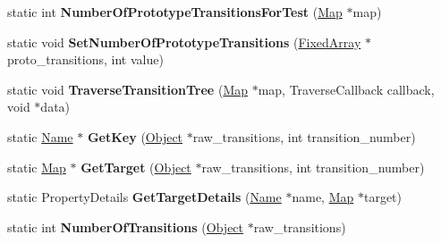 \begin{DoxyCompactItemize}
\item 
static int {\bfseries Number\+Of\+Prototype\+Transitions\+For\+Test} (\hyperlink{classv8_1_1internal_1_1_map}{Map} $\ast$map)\hypertarget{classv8_1_1internal_1_1_transition_array_a381a053abda5f8f7c09275e63b7a2a9a}{}\label{classv8_1_1internal_1_1_transition_array_a381a053abda5f8f7c09275e63b7a2a9a}

\item 
static void {\bfseries Set\+Number\+Of\+Prototype\+Transitions} (\hyperlink{classv8_1_1internal_1_1_fixed_array}{Fixed\+Array} $\ast$proto\+\_\+transitions, int value)\hypertarget{classv8_1_1internal_1_1_transition_array_a8c2e74b7b2bc1facb107706210914654}{}\label{classv8_1_1internal_1_1_transition_array_a8c2e74b7b2bc1facb107706210914654}

\item 
static void {\bfseries Traverse\+Transition\+Tree} (\hyperlink{classv8_1_1internal_1_1_map}{Map} $\ast$map, Traverse\+Callback callback, void $\ast$data)\hypertarget{classv8_1_1internal_1_1_transition_array_ab81a2e91619e1fa8ad0abba70a25fcfa}{}\label{classv8_1_1internal_1_1_transition_array_ab81a2e91619e1fa8ad0abba70a25fcfa}

\item 
static \hyperlink{classv8_1_1internal_1_1_name}{Name} $\ast$ {\bfseries Get\+Key} (\hyperlink{classv8_1_1internal_1_1_object}{Object} $\ast$raw\+\_\+transitions, int transition\+\_\+number)\hypertarget{classv8_1_1internal_1_1_transition_array_a78bcd0af8ebe9902a2a54a32578e5ba6}{}\label{classv8_1_1internal_1_1_transition_array_a78bcd0af8ebe9902a2a54a32578e5ba6}

\item 
static \hyperlink{classv8_1_1internal_1_1_map}{Map} $\ast$ {\bfseries Get\+Target} (\hyperlink{classv8_1_1internal_1_1_object}{Object} $\ast$raw\+\_\+transitions, int transition\+\_\+number)\hypertarget{classv8_1_1internal_1_1_transition_array_a154b555be9a60a1c977fb58bf046aca4}{}\label{classv8_1_1internal_1_1_transition_array_a154b555be9a60a1c977fb58bf046aca4}

\item 
static Property\+Details {\bfseries Get\+Target\+Details} (\hyperlink{classv8_1_1internal_1_1_name}{Name} $\ast$name, \hyperlink{classv8_1_1internal_1_1_map}{Map} $\ast$target)\hypertarget{classv8_1_1internal_1_1_transition_array_a9ab7e05957847ab1fa4744632ff57cdc}{}\label{classv8_1_1internal_1_1_transition_array_a9ab7e05957847ab1fa4744632ff57cdc}

\item 
static int {\bfseries Number\+Of\+Transitions} (\hyperlink{classv8_1_1internal_1_1_object}{Object} $\ast$raw\+\_\+transitions)\hypertarget{classv8_1_1internal_1_1_transition_array_a9e266b2d8475f80c42a87765d0f8a13d}{}\label{classv8_1_1internal_1_1_transition_array_a9e266b2d8475f80c42a87765d0f8a13d}


\end{DoxyCompactItemize}

